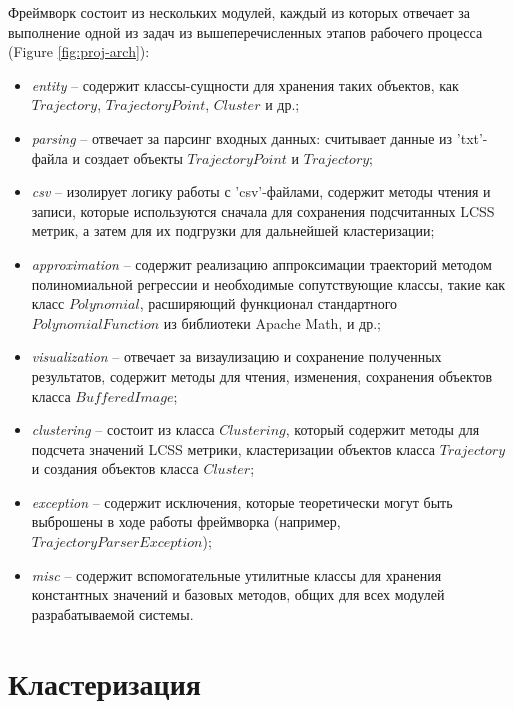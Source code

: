 Фреймворк состоит из нескольких модулей, каждый из которых отвечает за выполнение одной из задач из вышеперечисленных этапов рабочего процесса (Figure \ref{fig:proj-arch}):
\begin{itemize}
	\item \textit{entity} -- содержит классы-сущности для хранения таких объектов, как $Trajectory$, $TrajectoryPoint$, $Cluster$ и др.;
	\item \textit{parsing} -- отвечает за парсинг входных данных: считывает данные из 'txt'-файла и создает объекты $TrajectoryPoint$ и $Trajectory$;
	\item \textit{csv} -- изолирует логику работы с 'csv'-файлами, содержит методы чтения и записи, которые используются сначала для сохранения подсчитанных LCSS метрик, а затем для их подгрузки для дальнейшей кластеризации;
	\item \textit{approximation} -- содержит реализацию аппроксимации траекторий методом полиномиальной регрессии и необходимые сопутствующие классы, такие как класс $Polynomial$, расширяющий функционал стандартного $PolynomialFunction$ из библиотеки Apache Math, и др.;
	\item \textit{visualization} -- отвечает за визаулизацию и сохранение полученных результатов, содержит методы для чтения, изменения, сохранения объектов класса $BufferedImage$;
	\item \textit{clustering} -- состоит из класса $Clustering$, который содержит методы для подсчета значений LCSS метрики, кластеризации объектов класса $Trajectory$ и создания объектов класса $Cluster$;
	\item \textit{exception} -- содержит исключения, которые теоретически могут быть выброшены в ходе работы фреймворка (например, $TrajectoryParserException$);
	\item \textit{misc} -- содержит вспомогательные утилитные классы для хранения константных значений и базовых методов, общих для всех модулей разрабатываемой системы.
\end{itemize}


\section{Кластеризация}


